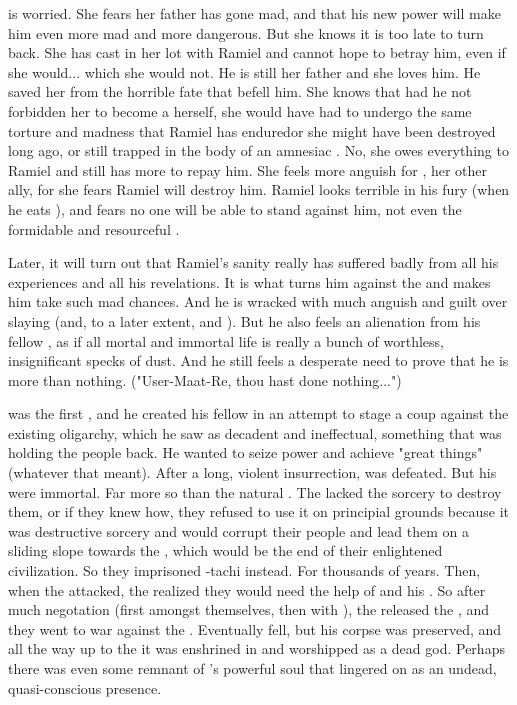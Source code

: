 \Cishiel is worried.
She fears her father has gone mad, and that his new power will make him even more mad and more dangerous.
But she knows it is too late to turn back.
She has cast in her lot with Ramiel and cannot hope to betray him, even if she would... which she would not.
He is still her father and she loves him. 
He saved her from the horrible fate that befell him.
She knows that had he not forbidden her to become a \malach herself, she would have had to undergo the same torture and madness that Ramiel has endured\dash{}or she might have been destroyed long ago, or still trapped in the body of an amnesiac \human.
No, she owes everything to Ramiel and still has more to repay him.
She feels more anguish for \Dasteron, her other ally, for she fears Ramiel will destroy him.
Ramiel looks terrible in his fury (when he eats \Gilchad), and \Cishiel fears no one will be able to stand against him, not even the formidable and resourceful \Dasteron.

Later, it will turn out that Ramiel's sanity really has suffered badly from all his experiences and all his revelations.
It is what turns him against the \banes and makes him take such mad chances.
And he is wracked with much anguish and guilt over slaying \Shiaraid (and, to a later extent, \Dasteron and \Gilchad).
But he also feels an alienation from his fellow \resphain, as if all mortal and immortal life is really a bunch of worthless, insignificant specks of dust.
And he still feels a desperate need to prove that he is more than nothing.
("User-Maat-Re, thou hast done nothing...")

\Sethicus was the first \dragon, and he created his fellow \dragons in an attempt to stage a coup against the existing \ophidian oligarchy, which he saw as decadent and ineffectual, something that was holding the \ophidian people back. 
He wanted to seize power and achieve "great things" (whatever that meant). 
After a long, violent insurrection, \Sethicus was defeated.
But his \dragons were immortal.
Far more so than the natural \ophidians.
The \ophidians lacked the sorcery to destroy them, or if they knew how, they refused to use it on principial grounds because it was destructive sorcery and would corrupt their people and lead them on a sliding slope towards the \xs, which would be the end of their enlightened civilization.
So they imprisoned \Sethicus-tachi instead.
For thousands of years. 
Then, when the \banes attacked, the \ophidians realized they would need the help of \Sethicus and his \dragons. 
So after much negotation (first amongst themselves, then with \Sethicus), the \ophidians released the \dragons, and they went to war against the \banes.
Eventually \Sethicus fell, but his corpse was preserved, and all the way up to the \thirdbanewar it was enshrined in \Dathka and worshipped as a dead god. 
Perhaps there was even some remnant of \Sethicus's powerful soul that lingered on as an undead, quasi-conscious presence.



